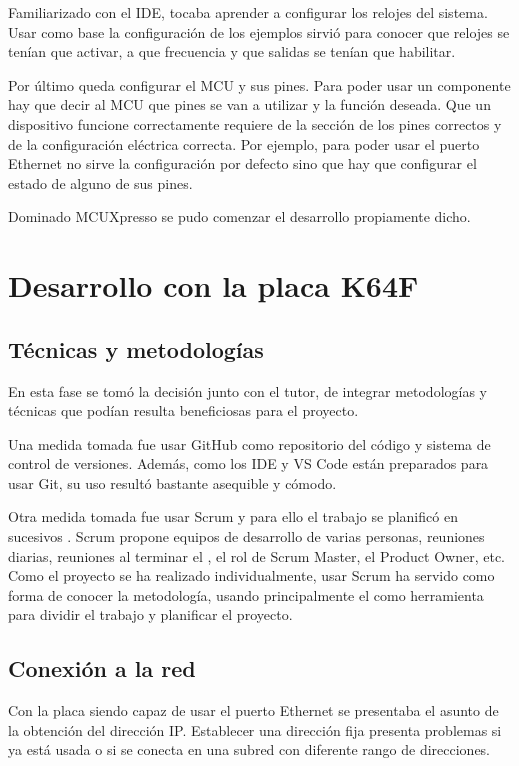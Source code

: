 Familiarizado con el IDE, tocaba aprender a configurar los relojes del sistema.
Usar como base la configuración de los ejemplos sirvió para conocer que relojes
se tenían que activar, a que frecuencia y que salidas se tenían que habilitar.

Por último queda configurar el MCU y sus pines. Para poder usar un componente
hay que decir al MCU que pines se van a utilizar y la función deseada. Que un
dispositivo funcione correctamente requiere de la sección de los pines 
correctos y de la configuración eléctrica correcta. Por ejemplo,
para poder usar el puerto Ethernet no sirve la configuración por defecto sino
que hay que configurar el estado  de alguno de sus pines.

Dominado MCUXpresso se pudo comenzar el desarrollo propiamente dicho.

\section{Desarrollo con la placa K64F}{\label{sec:desarrollo-k64f}}

\subsection{Técnicas y metodologías}{\label{sec:desarrollo-tym}}
En esta fase se tomó la decisión junto con el tutor, de integrar metodologías y 
técnicas que podían resulta beneficiosas para el proyecto.

Una medida tomada fue usar GitHub como repositorio del código y sistema de 
control de versiones. Además, como los IDE y VS Code están preparados para
usar Git, su uso resultó bastante asequible y cómodo.

Otra medida tomada fue usar Scrum y para ello el trabajo se planificó en
sucesivos . Scrum propone equipos de desarrollo
de varias personas, reuniones diarias, reuniones al terminar el
, el rol de Scrum Master, el Product Owner, etc.
Como el proyecto se ha realizado individualmente, usar Scrum ha servido como
forma de conocer la metodología, usando principalmente el 
como herramienta para dividir el trabajo y planificar el proyecto.

\subsection{Conexión a la red}{\label{sec:desarrollo-red}}
Con la placa siendo capaz de usar el puerto Ethernet se presentaba el asunto
de la obtención del dirección IP. Establecer una dirección fija presenta
problemas si ya está usada o si se conecta en una subred con diferente rango
de direcciones.


